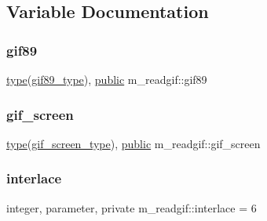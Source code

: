 \subsection{Variable Documentation}
\mbox{\label{namespacem__readgif_a1d5a3f008ce6a2b13029a0977dba1aa1}} 
\subsubsection{\texorpdfstring{gif89}{gif89}}
{\footnotesize\ttfamily \hyperlink{stop__watch_83_8txt_a70f0ead91c32e25323c03265aa302c1c}{type}(\hyperlink{structm__readgif_1_1gif89__type}{gif89\+\_\+type}), \hyperlink{M__stopwatch_83_8txt_a2f74811300c361e53b430611a7d1769f}{public} m\+\_\+readgif\+::gif89}

\mbox{\label{namespacem__readgif_a6253fc469a2750e1d59bc498bca3d6eb}} 
\subsubsection{\texorpdfstring{gif\+\_\+screen}{gif\_screen}}
{\footnotesize\ttfamily \hyperlink{stop__watch_83_8txt_a70f0ead91c32e25323c03265aa302c1c}{type}(\hyperlink{structm__readgif_1_1gif__screen__type}{gif\+\_\+screen\+\_\+type}), \hyperlink{M__stopwatch_83_8txt_a2f74811300c361e53b430611a7d1769f}{public} m\+\_\+readgif\+::gif\+\_\+screen}

\mbox{\label{namespacem__readgif_af71b0131b0327843ab00d56288f1e4a3}} 
\subsubsection{\texorpdfstring{interlace}{interlace}}
{\footnotesize\ttfamily integer, parameter, private m\+\_\+readgif\+::interlace = 6\hspace{0.3cm}{\ttfamily [private]}}

\mbox{\label{namespacem__readgif_ae5e05cba63ef3a16c27f9935d6c2a24d}} 
